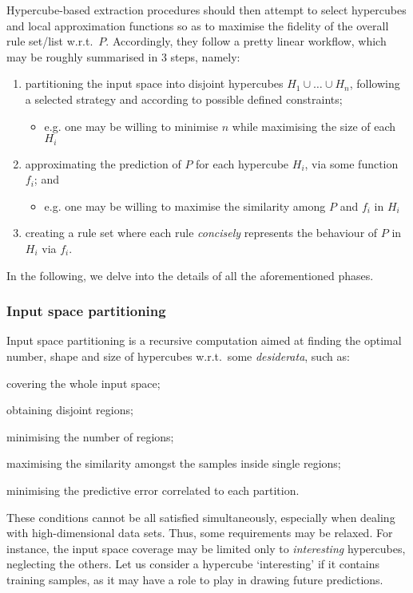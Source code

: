 \documentclass[
]{ceurart}
\begin{document}
Hypercube-based extraction procedures should then attempt to select hypercubes and local approximation functions so as to maximise the fidelity of the overall rule set/list w.r.t.\ $P$.
%
Accordingly, they follow a pretty linear workflow, which may be roughly summarised in 3 steps, namely:
%
\begin{enumerate}
	\item partitioning the input space into disjoint hypercubes $H_1 \cup \ldots \cup H_n$, following a selected strategy and according to possible defined constraints;
	\begin{itemize}
		\item e.g. one may be willing to minimise $n$ while maximising the size of each $H_i$
	\end{itemize}
	\item approximating the prediction of $P$ for each hypercube $H_i$, via some function $f_i$; and
	\begin{itemize}
		\item e.g. one may be willing to maximise the similarity among $P$ and $f_i$ in $H_i$
	\end{itemize}
	\item creating a rule set where each rule \emph{concisely} represents the behaviour of $P$ in $H_i$ via $f_i$.
\end{enumerate}
%
In the following, we delve into the details of all the aforementioned phases.

\subsubsection{Input space partitioning}

Input space partitioning is a recursive computation aimed at finding the optimal number, shape and size of hypercubes w.r.t.\ some \emph{desiderata}, such as:
%
\begin{inlinelist}
	\item covering the whole input space;
	\item obtaining disjoint regions;
	\item minimising the number of regions;
	\item maximising the similarity amongst the samples inside single regions;
	\item minimising the predictive error correlated to each partition.
\end{inlinelist}

These conditions cannot be all satisfied simultaneously, especially when dealing with high-dimensional data sets.
%
Thus, some requirements may be relaxed.
%
For instance, the input space coverage may be limited only to \emph{interesting} hypercubes, neglecting the others.
%
Let us consider a hypercube `interesting' if it contains training samples, as it may have a role to play in drawing future predictions.
\end{document}
